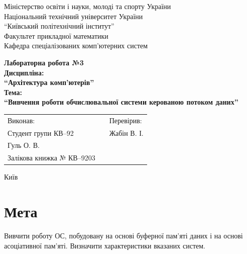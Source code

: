 \documentclass[a4paper, 10pt]{article}
\begin{document}
\begin{titlepage}
\begin{center}
\large{
Міністерство освіти і науки, молоді та спорту України\\
Національний технічний університет України\\
``Київський політехнічний інститут''\\
Факультет прикладної математики\\
Кафедра спеціалізованих комп’ютерних систем\\
}

\vfill

\large{\bf{
Лабораторна робота №3\\
Дисципліна:\\
``Архітектура комп'ютерів''\\
Тема:\\
``Вивчення роботи обчислювальної системи керованою потоком даних''\\
}}

\vfill

\begin{table}[h]
\centering
\begin{tabular}{lp{4cm}l}
Виконав:&&Перевірив:\\
Студент групи КВ--92&&Жабін В. І.\\
Гуль О. В.&&\\
Залікова книжка № КВ--9203&&\\
\end{tabular}
\end{table}

\vfill

Київ \the\year
\end{center}
\end{titlepage}
\newpage

\section{Мета}
Вивчити роботу ОС, побудовану на основі буферної пам'яті даних і на основі асоціативної пам'яті. Визначити характеристики вказаних систем.
\end{document}
